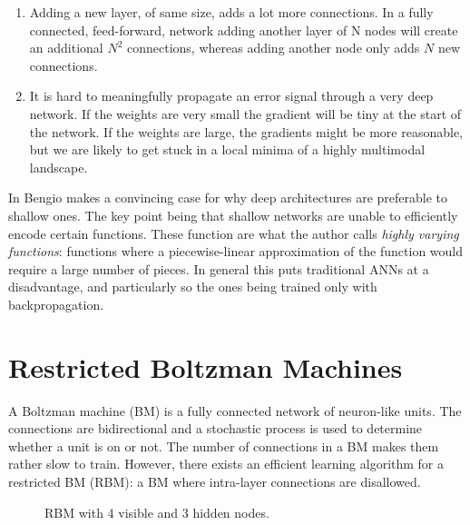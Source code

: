 \documentclass[11pt]{article}
\begin{document}
\begin{enumerate}
\item Adding a new layer, of same size, adds a lot more connections.  In a fully connected, feed-forward, network adding another layer of N nodes will create an additional $N^2$ connections, whereas adding another node only adds $N$ new connections.
\item It is hard to meaningfully propagate an error signal through a very deep network.  If the weights are very small the gradient will be tiny at the start of the network.  If the weights are large, the gradients might be more reasonable, but we are likely to get stuck in a local minima of a highly multimodal landscape.
\end{enumerate}

In \cite{bengio09} Bengio makes a convincing case for why deep architectures are preferable to shallow ones.  The key point being that shallow networks are unable to efficiently encode certain functions.  These function are what the author calls \textit{highly varying functions}: functions where a piecewise-linear approximation of the function would require a large number of pieces.  In general this puts traditional ANNs at a disadvantage, and particularly so the ones being trained only with backpropagation.

\section{Restricted Boltzman Machines}

A Boltzman machine (BM) is a fully connected network of neuron-like units.  The connections are bidirectional and a stochastic process is used to determine whether a unit is on or not.  The number of connections in a BM makes them rather slow to train.  However, there exists an efficient learning algorithm\cite{hinton06} for a restricted BM (RBM): a BM where intra-layer connections are disallowed.

\begin{figure}[htb]
  \centering
  \scalebox{0.5}
  {
  }
  \label{fig:rbm}
  \caption{RBM with 4 visible and 3 hidden nodes.}
\end{figure}
\end{document}
